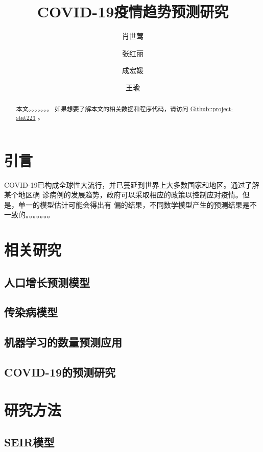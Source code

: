 \documentclass[lang=cn,11pt,a4paper,cite=authoryear]{elegantpaper}
\title{COVID-19疫情趋势预测研究}
\author{肖世莺 \and 张红丽 \and 成宏媛 \and 王瑜}
\date{}
\begin{document}
\maketitle

\begin{abstract}
本文。。。。。。。
如果想要了解本文的相关数据和程序代码，请访问
\href{https://github.com/data-science-in-action/project-stat223}{Github::project-stat223}
。
\end{abstract}

\section{引言}
COVID-19已构成全球性大流行，并已蔓延到世界上大多数国家和地区。通过了解某个地区确
诊病例的发展趋势，政府可以采取相应的政策以控制应对疫情。但是，单一的模型估计可能会得出有
偏的结果，不同数学模型产生的预测结果是不一致的。。。。。。。

\section{相关研究}

\subsection{人口增长预测模型}

\subsection{传染病模型}

\subsection{机器学习的数量预测应用}

\subsection{COVID-19的预测研究}

\section{研究方法}

\subsection{SEIR模型}
\end{document}

